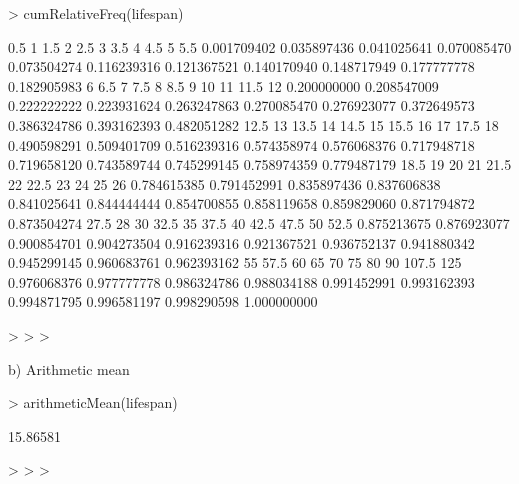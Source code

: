 \documentclass[a4paper]{article}
\begin{document}
\begin{Schunk}
\begin{Sinput}
> cumRelativeFreq(lifespan)
\end{Sinput}
\begin{Soutput}
        0.5           1         1.5           2         2.5           3         3.5           4         4.5           5         5.5 
0.001709402 0.035897436 0.041025641 0.070085470 0.073504274 0.116239316 0.121367521 0.140170940 0.148717949 0.177777778 0.182905983 
          6         6.5           7         7.5           8         8.5           9          10          11        11.5          12 
0.200000000 0.208547009 0.222222222 0.223931624 0.263247863 0.270085470 0.276923077 0.372649573 0.386324786 0.393162393 0.482051282 
       12.5          13        13.5          14        14.5          15        15.5          16          17        17.5          18 
0.490598291 0.509401709 0.516239316 0.574358974 0.576068376 0.717948718 0.719658120 0.743589744 0.745299145 0.758974359 0.779487179 
       18.5          19          20          21        21.5          22        22.5          23          24          25          26 
0.784615385 0.791452991 0.835897436 0.837606838 0.841025641 0.844444444 0.854700855 0.858119658 0.859829060 0.871794872 0.873504274 
       27.5          28          30        32.5          35        37.5          40        42.5        47.5          50        52.5 
0.875213675 0.876923077 0.900854701 0.904273504 0.916239316 0.921367521 0.936752137 0.941880342 0.945299145 0.960683761 0.962393162 
         55        57.5          60          65          70          75          80          90       107.5         125 
0.976068376 0.977777778 0.986324786 0.988034188 0.991452991 0.993162393 0.994871795 0.996581197 0.998290598 1.000000000 
\end{Soutput}
\begin{Sinput}
> 
> 
> 
\end{Sinput}
\end{Schunk}







b) Arithmetic mean



\begin{Schunk}
\begin{Sinput}
> arithmeticMean(lifespan)
\end{Sinput}
\begin{Soutput}
[1] 15.86581
\end{Soutput}
\begin{Sinput}
> 
> 
> 
\end{Sinput}
\end{Schunk}
\end{document}
